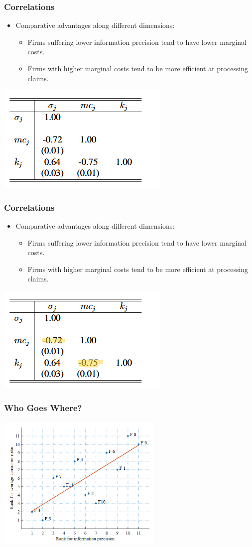 \documentclass[10pt,aspectratio=169]{beamer}
\begin{document}
\begin{frame}
\frametitle{Correlations}
    \begin{itemize}
        \item Comparative advantages along different dimensions:
        \begin{itemize}
            \item Firms suffering lower information precision tend to have lower marginal costs.
            \item Firms with higher marginal costs tend to be more efficient at processing claims.
        \end{itemize}
    \end{itemize}
         \includegraphics[width=.38\linewidth]{Figures/Tab4.png} 
\end{frame}


\begin{frame}
\frametitle{Correlations}
    \begin{itemize}
        \item Comparative advantages along different dimensions:
        \begin{itemize}
            \item Firms suffering lower information precision tend to have lower marginal costs.
            \item Firms with higher marginal costs tend to be more efficient at processing claims.
        \end{itemize}
    \end{itemize}
         \includegraphics[width=.38\linewidth]{Figures/Tab4_highlighted.png} 
\end{frame}

\begin{frame}
\frametitle{Who Goes Where?}
    \centering
    \includegraphics[width=0.6\textwidth]{Figures/Fig4.png} 
\end{frame}
\end{document}

